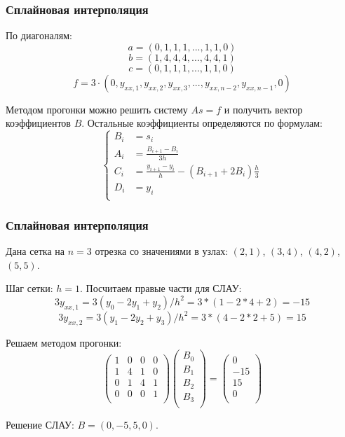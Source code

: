 \documentclass[10pt]{beamer}
\begin{document}
\begin{frame}[fragile]
\frametitle{Сплайновая интерполяция}
По диагоналям:
$$ a = (0, 1, 1, 1, ..., 1, 1, 0) $$
$$ b = (1, 4, 4, 4, ..., 4, 4, 1) $$
$$ c = (0, 1, 1, 1, ..., 1, 1, 0) $$
$$ f = 3 \cdot (0, {y}_{xx, 1}, {y}_{xx, 2}, {y}_{xx, 3}, ..., {y}_{xx, n-2}, {y}_{xx, n-1}, 0) $$

Методом прогонки можно решить систему $A s = f$ и получить вектор коэффициентов $B$. Остальные коэффициенты определяются по формулам:
$$
\begin{cases}
B_i &= s_i \\
A_i &= \frac{B_{i+1} - B_i}{3 h}\\
C_i &= \frac{y_{i+1} - y_i}{h} - \left(B_{i+1} + 2 B_{i}\right) \frac{h}{3}\\
D_i &= y_i\\
\end{cases}
$$
\end{frame}

\begin{frame}[fragile]
\frametitle{Сплайновая интерполяция}

Дана сетка на $n=3$ отрезка со значениями в узлах: $(2, 1)$, $(3, 4)$, $(4, 2)$, $(5, 5)$.

Шаг сетки: $h = 1$. Посчитаем правые части для СЛАУ:
$$3 y_{xx, 1} = 3 (y_{0} - 2 y_{1} + y_{2}) /{h^2} = 3 * (1 - 2 * 4 + 2)  = - 15$$
$$3 y_{xx, 2} = 3 (y_{1} - 2 y_{2} + y_{3}) /{h^2} = 3 * (4 - 2 * 2 + 5)  = 15$$

Решаем методом прогонки:
$$
\begin{pmatrix}
  1 & 0 & 0 & 0 \\
  1 & 4 & 1 & 0 \\
  0 & 1 & 4 & 1 \\
  0 & 0 & 0 & 1 \\
\end{pmatrix}
\begin{pmatrix}
B_0\\
B_1\\
B_2\\
B_3\\
\end{pmatrix}
=
\begin{pmatrix}
0\\
-15 \\
15 \\
0 \\
\end{pmatrix}
$$

Решение СЛАУ: $B = (0, -5, 5, 0)$. 

\end{frame}
\end{document}
